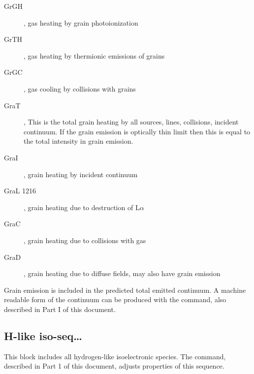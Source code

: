 \begin{description}
\item[GrGH], gas heating by grain photoionization

\item[GrTH], gas heating by thermionic emissions of grains

\item[GrGC], gas cooling by collisions with grains

\item[GraT], This is the total grain heating by all sources, lines, collisions,
incident continuum.  If the grain emission is optically thin limit then
this is equal to the total intensity in grain emission.

\item[GraI], grain heating by incident continuum

\item[GraL 1216], grain heating due to destruction of L$\alpha $

\item[GraC], grain heating due to collisions with gas

\item[GraD], grain heating due to diffuse fields, may also have grain emission
\end{description}

Grain emission is included in the predicted total emitted continuum.
A machine readable form of the continuum can be produced with the  command,
also described in Part I of this document.

\subsection{H-like iso-seq\ldots}

This block includes all hydrogen-like isoelectronic species.
The  command,
described in Part 1 of this document, adjusts properties
of this sequence.

